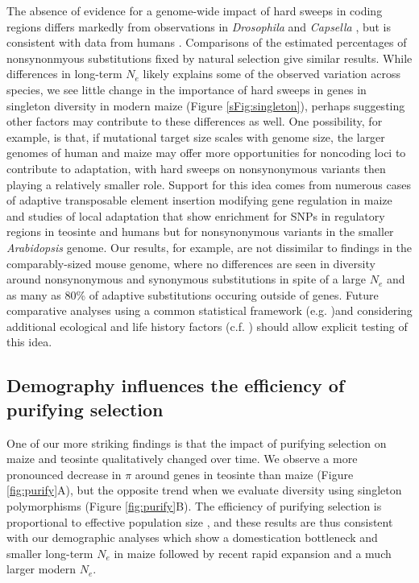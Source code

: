 \documentclass[12pt,a4paper]{article}
\begin{document}
The absence of evidence for a genome-wide impact of hard sweeps in coding regions differs markedly from observations in \emph{Drosophila} \cite{sattath2011} and \emph{Capsella} \cite{williamson2014}, but is consistent with data from humans \cite{hernandez2011,pritchard2010genetics}.
Comparisons of the estimated percentages of nonsynonmyous substitutions fixed by natural selection \cite{ross2009,sella2009,eyre2009estimating,williamson2014} give similar results. 
While differences in long-term $N_e$ likely explains some of the observed variation across species, we see little change in the importance of hard sweeps in genes in singleton diversity in modern maize (Figure \ref{sFig:singleton}), perhaps suggesting other factors may contribute to these differences as well.  
One possibility, for example, is that, if mutational target size scales with genome size, the larger genomes of human and maize may offer more opportunities for noncoding loci to contribute to adaptation, with hard sweeps on nonsynonymous variants then playing a relatively smaller role. 
Support for this idea comes from numerous cases of adaptive transposable element insertion modifying gene regulation in maize \cite{studer2011,castelletti2014mite,mao2015,yang2013} and studies of local adaptation that show enrichment for SNPs in regulatory regions in teosinte \cite{pyhajarvi2013} and humans \cite{fraser2013gene} but for nonsynonymous variants in the smaller \emph{Arabidopsis} genome.  
Our results, for example, are not dissimilar to findings in the comparably-sized mouse genome, where no differences are seen in diversity around nonsynonymous and synonymous substitutions in spite of a large $N_e$ and  as many as 80\% of adaptive substitutions occuring outside of genes\cite{Halligan:2013ir}.
Future comparative analyses using a common statistical framework (e.g. \cite{corbett2015} )and considering additional ecological and life history factors (c.f. \cite{leffler2012}) should allow explicit testing of this idea.

\subsection*{Demography influences the efficiency of purifying selection} %
One of our more striking findings is that the impact of purifying selection on maize and teosinte qualitatively changed over time. 
We observe a more pronounced decrease in $\pi$ around genes in teosinte than maize (Figure \ref{fig:purify}A), but the opposite trend when we evaluate diversity using singleton polymorphisms (Figure \ref{fig:purify}B).
The efficiency of purifying selection is proportional to effective population size \cite{kimura1984}, and these results are thus consistent with our demographic analyses which show a domestication bottleneck and smaller long-term $N_e$ in maize \cite{eyre1998, tenaillon2004, wright2005, ross2009} followed by recent rapid expansion and a much larger modern $N_e$.  
\end{document}
